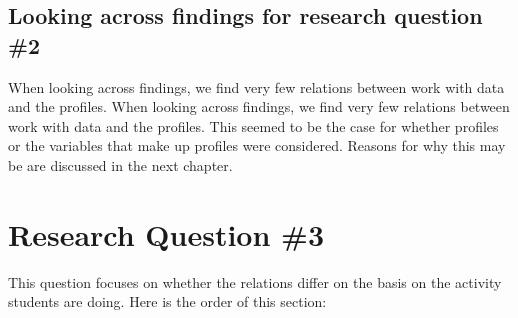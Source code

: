 \documentclass[]{book}
\theoremstyle{definition}
\theoremstyle{definition}
\theoremstyle{definition}
\theoremstyle{remark}
\begin{document}
\begin{landscape}\begin{table}

\caption{\label{tab:unnamed-chunk-14}Results of mixed effects models for the composite}
\centering
{}
\end{table}
\end{landscape}

\subsection{Looking across findings for research question
\#2}\label{looking-across-findings-for-research-question-2}

When looking across findings, we find very few relations between work
with data and the profiles. When looking across findings, we find very
few relations between work with data and the profiles. This seemed to be
the case for whether profiles or the variables that make up profiles
were considered. Reasons for why this may be are discussed in the next
chapter.

\section{Research Question \#3}\label{research-question-3}

This question focuses on whether the relations differ on the basis on
the activity students are doing. Here is the order of this section:
\end{document}
